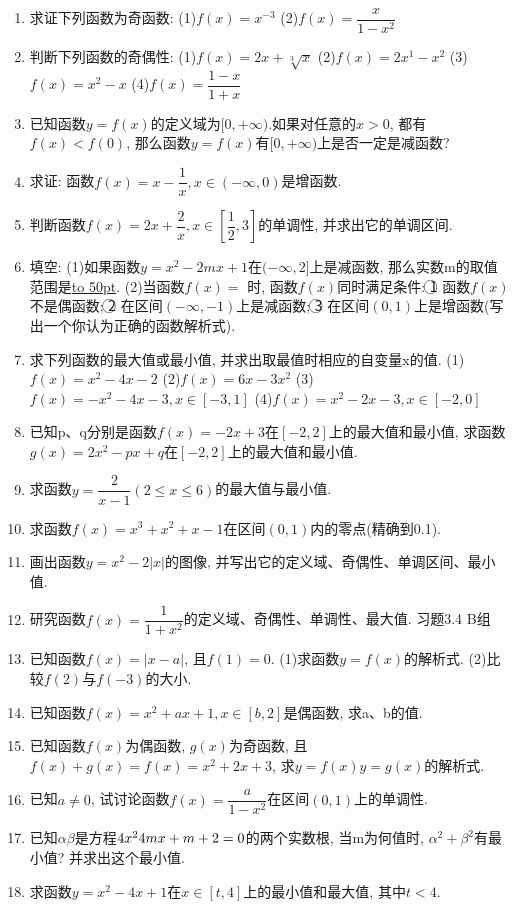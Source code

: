 \documentclass[10pt,a4paper]{article}
\newcommand{\blank}[1]{\underline{\hbox to #1pt{}}}
\begin{document}
\begin{enumerate}[1.]
\item 求证下列函数为奇函数:
(1)$f(x)=x^{-3}$								(2)$f(x)=\dfrac x{1-x^2}$
\item 判断下列函数的奇偶性:
(1)$f(x)=2x+\sqrt[3]x$						(2)$f(x)=2x^1-x^2$
(3)$f(x)=x^2-x$							(4)$f(x)=\dfrac{1-x}{1+x}$
\item 已知函数$y=f(x)$的定义域为$[0,+\infty)$.如果对任意的$x>0$, 都有$f(x)<f(0)$, 那么函数$y=f(x)$有$[0,+\infty)$上是否一定是减函数?
\item 求证: 函数$f(x)=x-\dfrac 1x,x\in (-\infty ,0)$是增函数.
\item 判断函数$f(x)=2x+\dfrac 2x,x\in [\dfrac 12,3]$的单调性, 并求出它的单调区间.
\item 填空:
(1)如果函数$y=x^2-2mx+1$在$(-\infty ,2]$上是减函数, 那么实数m的取值范围是\blank{50}.
(2)当函数$f(x)=$				时, 函数$f(x)$同时满足条件: \textcircled{1} 函数$f(x)$不是偶函数; \textcircled{2} 在区间$(-\infty ,-1)$上是减函数; \textcircled{3} 在区间$(0,1)$上是增函数(写出一个你认为正确的函数解析式).
\item 求下列函数的最大值或最小值, 并求出取最值时相应的自变量x的值.
(1)$f(x)=x^2-4x-2$
(2)$f(x)=6x-3x^2$
(3)$f(x)=-x^2-4x-3,x\in [-3,1]$
(4)$f(x)=x^2-2x-3,x\in [-2,0]$
\item 已知p、q分别是函数$f(x)=-2x+3$在$[-2,2]$上的最大值和最小值, 求函数$g(x)=2x^2-px+q$在$[-2,2]$上的最大值和最小值.
\item 求函数$y=\dfrac 2{x-1}(2\le x\le 6)$的最大值与最小值.
\item 求函数$f(x)=x^3+x^2+x-1$在区间$(0,1)$内的零点(精确到0.1).
\item 画出函数$y=x^2-2|x|$的图像, 并写出它的定义域、奇偶性、单调区间、最小值.
\item 研究函数$f(x)=\dfrac 1{1+x^2}$的定义域、奇偶性、单调性、最大值.
习题3.4  B组
\item 已知函数$f(x)=|x-a|$, 且$f(1)=0$.
(1)求函数$y=f(x)$的解析式.
(2)比较$f(2)$与$f(-3)$的大小.
\item 已知函数$f(x)=x^2+ax+1,x\in [b,2]$是偶函数, 求a、b的值.
\item 已知函数$f(x)$为偶函数, $g(x)$为奇函数, 且$f(x)+g(x)=f(x)=x^2+2x+3$, 求$y=f(x)y=g(x)$的解析式.
\item 已知$a\ne 0$, 试讨论函数$f(x)=\dfrac a{1-x^2}$在区间$(0,1)$上的单调性.
\item 已知$\alpha \beta$是方程$\text4x^24mx+m+2=0$的两个实数根, 当m为何值时, $\alpha ^2+\beta ^2$有最小值? 并求出这个最小值.
\item 求函数$y=x^2-4x+1$在$x\in [t,4]$上的最小值和最大值, 其中$t<4$.

\end{enumerate}
\end{document}
